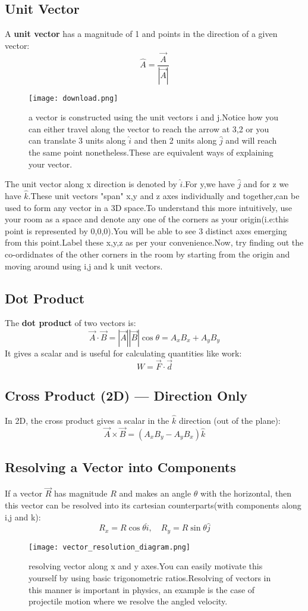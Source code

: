 \documentclass[12pt]{article}
\begin{document}
\subsection*{Unit Vector}
A \textbf{unit vector} has a magnitude of 1 and points in the direction of a given vector:
\[
\hat{A} = \frac{\vec{A}}{|\vec{A}|}
\]
\begin{figure}[hbt!]
    \centering
    \texttt{[image: download.png]}
    \caption{a vector is constructed using the unit vectors i and j.Notice how you can either travel along the vector to reach the arrow at 3,2 or you can translate 3 units along $\hat{i}$ and then 2 units along $\hat{j}$ and will reach the same point nonetheless.These are equivalent ways of explaining your vector.}
    \label{fig:enter-label}
\end{figure}
The unit vector along x direction is denoted by $\hat{i}$.For y,we have $\hat{j}$ and for z we have $\hat{k}$.These unit vectors "span" x,y and z axes individually and together,can be used to form any vector in a 3D space.To understand this more intuitively, use your room as a space and denote any one of the corners as your origin(i.e:this point is represented by 0,0,0).You will be able to see 3 distinct axes emerging from this point.Label these x,y,z as per your convenience.Now, try finding out the co-ordidnates of the other corners in the room by starting from the origin and moving around using i,j and k unit vectors.

\subsection*{Dot Product}
The \textbf{dot product} of two vectors is:
\[
\vec{A} \cdot \vec{B} = |\vec{A}| |\vec{B}| \cos\theta = A_x B_x + A_y B_y
\]
It gives a scalar and is useful for calculating quantities like work:
\[
W = \vec{F} \cdot \vec{d}
\]

\subsection*{Cross Product (2D) — Direction Only}
In 2D, the cross product gives a scalar in the \( \hat{k} \) direction (out of the plane):
\[
\vec{A} \times \vec{B} = (A_x B_y - A_y B_x)\hat{k}
\]

\subsection*{Resolving a Vector into Components}
If a vector \( \vec{R} \) has magnitude \( R \) and makes an angle \( \theta \) with the horizontal, then this vector can be resolved into its cartesian counterparts(with components along i,j and k):
\[
R_x = R \cos \theta \hat{i}, \quad R_y = R \sin \theta \hat{j}
\]
\begin{figure}[hbt!]
    \centering
    \texttt{[image: vector\_resolution\_diagram.png]}
    \caption{resolving vector along x and y axes.You can easily motivate this yourself by using basic trigonometric ratios.Resolving of vectors in this manner is important in physics, an example is the case of projectile motion where we resolve the angled velocity.}
    \label{fig:enter-label}
\end{figure}
\end{document}
